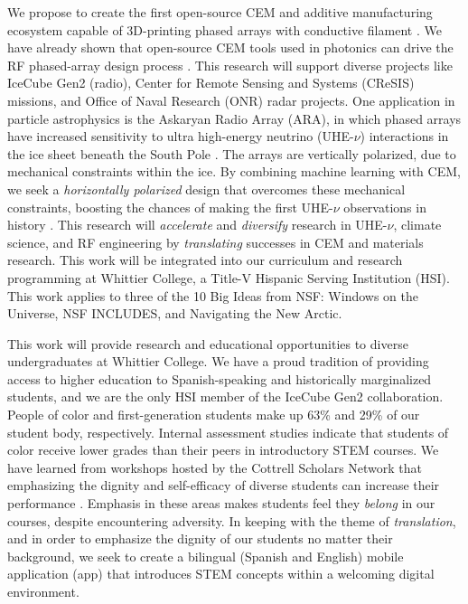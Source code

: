 \documentclass[../../main.tex]{subfiles}
\begin{document}
We propose to create the first open-source CEM and additive manufacturing ecosystem capable of 3D-printing phased arrays with conductive filament \cite{10.3390/electronics8121506, yurduseven,8786183}.  We have already shown that open-source CEM tools used in photonics can drive the RF phased-array design process \cite{electronics10040415,meepcon2022,10.1016/j.cpc.2009.11.008}.  This research will support diverse projects like IceCube Gen2 (radio), Center for Remote Sensing and Systems (CReSIS) missions, and Office of Naval Research (ONR) radar projects.  One application in particle astrophysics is the Askaryan Radio Array (ARA), in which phased arrays have increased sensitivity to ultra high-energy neutrino (UHE-$\nu$) interactions in the ice sheet beneath the South Pole \cite{PhysRevD.105.122006}.  The arrays are vertically polarized, due to mechanical constraints within the ice.  By combining machine learning with CEM, we seek a \textit{horizontally polarized} design that overcomes these mechanical constraints, boosting the chances of making the first UHE-$\nu$ observations in history \cite{10.1088/1748-0221/15/09/p09039}.  This research will \textit{accelerate} and \textit{diversify} research in UHE-$\nu$, climate science, and RF engineering by \textit{translating} successes in CEM and materials research.  This work will be integrated into our curriculum and research programming at Whittier College, a Title-V Hispanic Serving Institution (HSI).  This work applies to three of the 10 Big Ideas from NSF: Windows on the Universe, NSF INCLUDES, and Navigating the New Arctic. \\ \vspace{2.5mm}

This work will provide research and educational opportunities to diverse undergraduates at Whittier College.  We have a proud tradition of providing access to higher education to Spanish-speaking and historically marginalized students, and we are the only HSI member of the IceCube Gen2 collaboration.  People of color and first-generation students make up 63\% and 29\% of our student body, respectively.  Internal assessment studies indicate that students of color receive lower grades than their peers in introductory STEM courses.  We have learned from workshops hosted by the Cottrell Scholars Network that emphasizing the dignity and self-efficacy of diverse students can increase their performance \cite{cottrell1,cottrell2}.  Emphasis in these areas makes students feel they \textit{belong} in our courses, despite encountering adversity. In keeping with the theme of \textit{translation}, and in order to emphasize the dignity of our students no matter their background, we seek to create a bilingual (Spanish and English) mobile application (app) that introduces STEM concepts within a welcoming digital environment. \\ \vspace{2.5mm}
\end{document}
